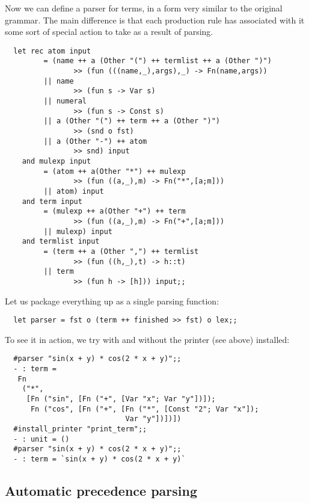 \noindent Now we can define a parser for terms, in a form very similar to the
original grammar. The main difference is that each production rule has
associated with it some sort of special action to take as a result of parsing.

\begin{boxed}\begin{lstlisting}
  let rec atom input
         = (name ++ a (Other "(") ++ termlist ++ a (Other ")")
                >> (fun (((name,_),args),_) -> Fn(name,args))
         || name
                >> (fun s -> Var s)
         || numeral
                >> (fun s -> Const s)
         || a (Other "(") ++ term ++ a (Other ")")
                >> (snd o fst)
         || a (Other "-") ++ atom
                >> snd) input
    and mulexp input
         = (atom ++ a(Other "*") ++ mulexp
                >> (fun ((a,_),m) -> Fn("*",[a;m]))
         || atom) input
    and term input
         = (mulexp ++ a(Other "+") ++ term
                >> (fun ((a,_),m) -> Fn("+",[a;m]))
         || mulexp) input
    and termlist input
         = (term ++ a (Other ",") ++ termlist
                >> (fun ((h,_),t) -> h::t)
         || term
                >> (fun h -> [h])) input;;
\end{lstlisting}\end{boxed}

\noindent Let us package everything up as a single parsing function:

\begin{boxed}\begin{lstlisting}
  let parser = fst o (term ++ finished >> fst) o lex;;
\end{lstlisting}\end{boxed}

\noindent To see it in action, we try with and without the printer (see above)
installed:

\begin{boxed}\begin{verbatim}
  #parser "sin(x + y) * cos(2 * x + y)";;
  - : term =
   Fn
    ("*",
     [Fn ("sin", [Fn ("+", [Var "x"; Var "y"])]);
      Fn ("cos", [Fn ("+", [Fn ("*", [Const "2"; Var "x"]);
                            Var "y"])])])
  #install_printer "print_term";;
  - : unit = ()
  #parser "sin(x + y) * cos(2 * x + y)";;
  - : term = `sin(x + y) * cos(2 * x + y)`
\end{verbatim}\end{boxed}

\subsection{Automatic precedence parsing}

